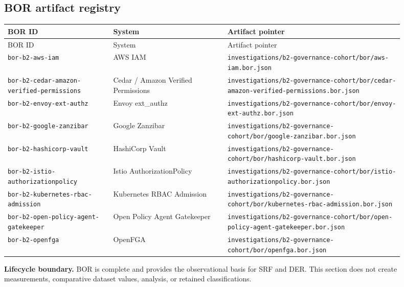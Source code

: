 \subsection{BOR artifact registry}
\begin{center}
\begin{longtable}{@{}p{0.24\linewidth}p{0.26\linewidth}p{0.40\linewidth}@{}}
\toprule
BOR ID & System & Artifact pointer \\
\midrule
\endfirsthead
\toprule
BOR ID & System & Artifact pointer \\
\midrule
\endhead
\bottomrule
\endfoot
\bottomrule
\endlastfoot
\texttt{bor-b2-aws-iam} & AWS IAM & \texttt{investigations/b2-governance-cohort/bor/aws-iam.bor.json} \\
\texttt{bor-b2-cedar-amazon-verified-permissions} & Cedar / Amazon Verified Permissions & \texttt{investigations/b2-governance-cohort/bor/cedar-amazon-verified-permissions.bor.json} \\
\texttt{bor-b2-envoy-ext-authz} & Envoy ext\_authz & \texttt{investigations/b2-governance-cohort/bor/envoy-ext-authz.bor.json} \\
\texttt{bor-b2-google-zanzibar} & Google Zanzibar & \texttt{investigations/b2-governance-cohort/bor/google-zanzibar.bor.json} \\
\texttt{bor-b2-hashicorp-vault} & HashiCorp Vault & \texttt{investigations/b2-governance-cohort/bor/hashicorp-vault.bor.json} \\
\texttt{bor-b2-istio-authorizationpolicy} & Istio AuthorizationPolicy & \texttt{investigations/b2-governance-cohort/bor/istio-authorizationpolicy.bor.json} \\
\texttt{bor-b2-kubernetes-rbac-admission} & Kubernetes RBAC Admission & \texttt{investigations/b2-governance-cohort/bor/kubernetes-rbac-admission.bor.json} \\
\texttt{bor-b2-open-policy-agent-gatekeeper} & Open Policy Agent Gatekeeper & \texttt{investigations/b2-governance-cohort/bor/open-policy-agent-gatekeeper.bor.json} \\
\texttt{bor-b2-openfga} & OpenFGA & \texttt{investigations/b2-governance-cohort/bor/openfga.bor.json} \\
\end{longtable}
\end{center}

\textbf{Lifecycle boundary.} BOR is complete and provides the observational basis for SRF and DER. This section does not create measurements, comparative dataset values, analysis, or retained classifications.
